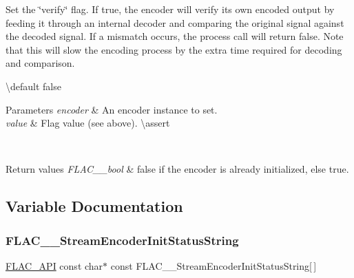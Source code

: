 Set the \char`\"{}verify\char`\"{} flag. If {\ttfamily true}, the encoder will verify it\textquotesingle{}s own encoded output by feeding it through an internal decoder and comparing the original signal against the decoded signal. If a mismatch occurs, the process call will return {\ttfamily false}. Note that this will slow the encoding process by the extra time required for decoding and comparison.

\textbackslash{}default {\ttfamily false} 
\begin{DoxyParams}{Parameters}
{\em encoder} & An encoder instance to set. \\
\hline
{\em value} & Flag value (see above). \textbackslash{}assert 
\begin{DoxyCode}{1}
\end{DoxyCode}
 \\
\hline
\end{DoxyParams}

\begin{DoxyRetVals}{Return values}
{\em F\+L\+A\+C\+\_\+\+\_\+bool} & {\ttfamily false} if the encoder is already initialized, else {\ttfamily true}. \\
\hline
\end{DoxyRetVals}


\subsection{Variable Documentation}
\mbox{\label{group__flac__stream__encoder_ga05203d2cf0390dfbbc2b57b0f0b8e2df}} 
\subsubsection{\texorpdfstring{FLAC\_\_StreamEncoderInitStatusString}{FLAC\_\_StreamEncoderInitStatusString}}
{\footnotesize\ttfamily \mbox{\hyperlink{group__flac__export_ga56ca07df8a23310707732b1c0007d6f5}{F\+L\+A\+C\+\_\+\+A\+PI}} const char$\ast$ const F\+L\+A\+C\+\_\+\+\_\+\+Stream\+Encoder\+Init\+Status\+String\mbox{[}$\,$\mbox{]}}

